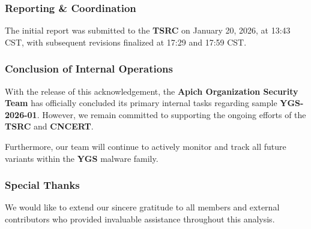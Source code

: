 \documentclass[
]{article}
\begin{document}
\subsubsection{\texorpdfstring{\textbf{Reporting \&
Coordination}}{Reporting \& Coordination}}\label{reporting--coordination}

The initial report was submitted to the \textbf{TSRC} on January 20,
2026, at 13:43 CST, with subsequent revisions finalized at 17:29 and
17:59 CST.

\subsubsection{\texorpdfstring{\textbf{Conclusion of Internal
Operations}}{Conclusion of Internal Operations}}\label{conclusion-of-internal-operations}

With the release of this acknowledgement, the \textbf{Apich Organization
Security Team} has officially concluded its primary internal tasks
regarding sample \textbf{YGS-2026-01}. However, we remain committed to
supporting the ongoing efforts of the \textbf{TSRC} and \textbf{CNCERT}.

Furthermore, our team will continue to actively monitor and track all
future variants within the \textbf{YGS} malware family.

\subsubsection{\texorpdfstring{\textbf{Special
Thanks}}{Special Thanks}}\label{special-thanks}

We would like to extend our sincere gratitude to all members and
external contributors who provided invaluable assistance throughout this
analysis.
\end{document}
